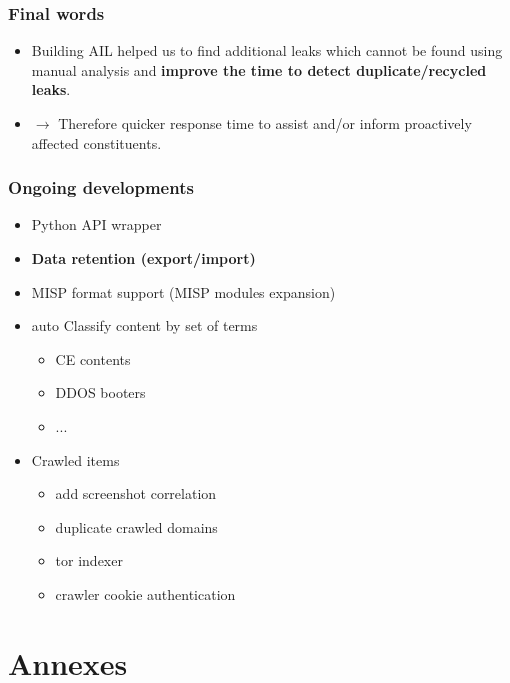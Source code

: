 \documentclass{beamer}
\begin{document}
\begin{frame}
   \frametitle{Final words}
   \begin{itemize}
        \item Building AIL helped us to find additional leaks which cannot be found using manual analysis and {\bf improve the time to detect duplicate/recycled leaks}.
            \vskip0.5cm
        \item[] $\rightarrow$ Therefore quicker response time to assist and/or inform proactively affected constituents.
   \end{itemize}
\end{frame}



\begin{frame}
    \frametitle{Ongoing developments}
        \begin{itemize}
            \item Python API wrapper
            \item {\bf Data retention (export/import)}
            \item MISP format support (MISP modules expansion)
            \item auto Classify content by set of terms
            \begin{itemize}
            	\item CE contents
            	\item DDOS booters
            	\item ...
            \end{itemize}
            \item Crawled items
            \begin{itemize}
            	\item add screenshot correlation
            	\item duplicate crawled domains
            	\item tor indexer
            	\item crawler cookie authentication
            \end{itemize}
        \end{itemize}
\end{frame}


\section{Annexes}
\end{document}
